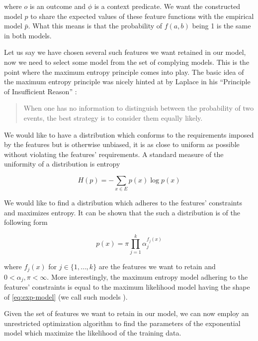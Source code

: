 where $o$ is an outcome and $\phi$ is a context predicate. We want the constructed
model $p$ to share the expected values of these feature functions with the
empirical model $\bar{p}$. What this means is that the probability of $f(a,b)$
being 1 is the same in both models.

Let us say we have chosen several such features we want retained in our model,
now we need to select some model from the set of complying models. This is the
point where the maximum entropy principle comes into play. The basic
idea of the maximum entropy principle was nicely hinted at by Laplace in his
``Principle of Insufficient Reason'' \cite{maxent-approach}:

\begin{quote}
When one has no information to distinguish between the probability of two
events, the best strategy is to consider them equally likely.
\end{quote}

We would like to have a distribution which conforms to the requirements imposed
by the features but is otherwise unbiased, it is as close to uniform as
possible without violating the features' requirements. A standard measure of
the uniformity of a distribution is entropy

\begin{equation}
\label{eq:entropy}
H(p) = -\sum_{x \in E} p(x) \log p(x)
\end{equation}

We would like to find a distribution which adheres to the features' constraints
and maximizes entropy. It can be shown \cite{maxent-approach,maxent-simple} that
the such a distribution is of the following form

\begin{equation}
\label{eq:exp-model}
p(x) = \pi \prod_{j=1}^k \alpha_j^{f_j(x)}
\end{equation}

where $f_j(x)$ for $j \in \{1,\dotsc,k\}$ are the features we want to retain
and $0 < \alpha_j,\pi < \infty$. More interestingly, the maximum entropy model
adhering to the features' constraints is equal to the maximum likelihood model
having the shape of \ref{eq:exp-model} (we call such models ). 

Given the set of features we want to retain in our model, we can now employ an
unrestricted optimization algorithm to find the parameters of the exponential
model which maximize the likelihood of the training data.

